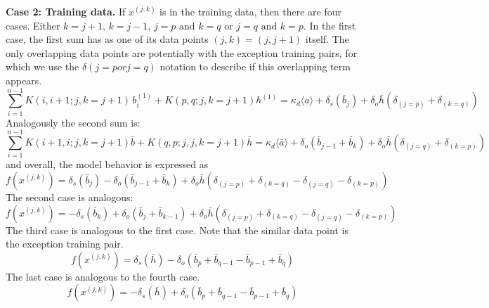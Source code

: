 \documentclass{article}
\theoremstyle{plain}
\begin{document}
\textbf{Case 2: Training data.} \quad 
If $x^{(j,k)}$ is in the training data, then there are four cases.  Either $k=j+1$, $k=j-1$, $j=p \text{ and } k=q$ or $j=q \text{ and } k=p$.
In the first case, the first sum has as one of its data points $(j,k)=(j,j+1)$ itself. The only overlapping data points are potentially with the exception training pairs, for which we use the $\delta(j = p or j = q)$ notation to describe if this overlapping term appears. 
\begin{equation}
\sum_{i=1}^{n-1} K(i,i+1; j,k = j+1)\, b_i^{(1)} + K(p,q;j,k=j+1)h^{(1)} 
=  \kappa_d \langle a \rangle + \delta_s(\bar{b}_j) + \delta_o \bar{h}(\delta_{(j=p)} + \delta_{(k=q)}) 
\tag{S66}
\end{equation}
Analogously the second sum is:
\begin{equation}
\sum_{i=1}^{n-1} K(i+1,i; j,k=j+1) \bar{b} + K(q,p;j,j,k=j+1) \bar{h} 
= \kappa_d \langle \bar{a} \rangle + 
\delta_o(\bar{b}_{j-1} + \bar{b}_{k}) + 
\delta_o \bar{h}(\delta_{(j=q)} + \delta_{(k=p)}) 
\tag{S66}
\end{equation}
and overall, the model behavior is expressed as
\begin{equation}
f(x^{(j,k)}) 
= \delta_s(\bar{b}_j) - \delta_o(\bar{b}_{j-1} + \bar{b}_{k}) + \delta_o \bar{h}(\delta_{(j=p)} + \delta_{(k=q)} - \delta_{(j=q)} - \delta_{(k=p)}) 
\tag{S66}
\end{equation}
The second case is analogous: 
\begin{equation}
f(x^{(j,k)}) 
= - \delta_s(\bar{b}_k) + \delta_o(\bar{b}_{j} + \bar{b}_{k-1}) + \delta_o \bar{h}(\delta_{(j=p)} + \delta_{(k=q)} - \delta_{(j=q)} - \delta_{(k=p)}) 
\tag{S66}
\end{equation}
The third case is analogous to the first case.  Note that the similar data point is the exception training pair.
\begin{equation}
f(x^{(j,k)}) 
= \delta_s(\bar{h}) - \delta_o(\bar{b}_{p} + \bar{b}_{q-1} - \bar{b}_{p-1} + \bar{b}_{q})
\tag{S66}
\end{equation}
The last case is analogous to the fourth case.  
\begin{equation}
f(x^{(j,k)}) 
= - \delta_s(\bar{h}) + \delta_o(\bar{b}_{p} + \bar{b}_{q-1} - \bar{b}_{p-1} + \bar{b}_{q})
\tag{S66}
\end{equation}
\end{document}
